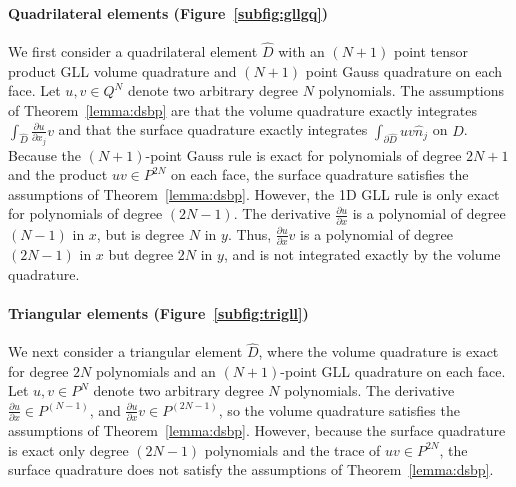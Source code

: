 \documentclass{svjour3}                     %
\renewcommand{\hat}{\widehat}
\newcommand{\pd}[2]{\frac{\partial#1}{\partial#2}}
\begin{document}
\paragraph{Quadrilateral elements (Figure~\ref{subfig:gllgq})} We first consider a quadrilateral element $\hat{D}$ with an $(N+1)$ point tensor product GLL volume quadrature and $(N+1)$ point Gauss quadrature on each face.  Let $u,v \in Q^N$ denote two arbitrary degree $N$ polynomials.  The assumptions of Theorem~\ref{lemma:dsbp} are that the volume quadrature exactly integrates $\int_{\hat{D}} \pd{u}{x_j} v$ and that the surface quadrature exactly integrates $\int_{\partial \hat{D}} u v \hat{n}_j$ on $\hat{D}$.  Because the $(N+1)$-point Gauss rule is exact for polynomials of degree $2N+1$ and the product $uv \in P^{2N}$ on each face, the surface quadrature satisfies the assumptions of Theorem~\ref{lemma:dsbp}.  However, the 1D GLL rule is only exact for polynomials of degree $(2N-1)$.  The derivative $\pd{u}{x}$ is a polynomial of degree $(N-1)$ in $x$, but is degree $N$ in $y$.  Thus, $\pd{u}{x}v$ is a polynomial of degree $(2N-1)$ in $x$ but degree $2N$ in $y$, and is not integrated exactly by the volume quadrature.  

\paragraph{Triangular elements (Figure~\ref{subfig:trigll})} We next consider a triangular element $\hat{D}$, where the volume quadrature is exact for degree $2N$ polynomials \cite{xiao2010quadrature} and an $(N+1)$-point GLL quadrature on each face.  Let $u,v \in P^N$ denote two arbitrary degree $N$ polynomials.  The derivative $\pd{u}{x} \in P^{(N-1)}$, and $\pd{u}{x}v \in P^{(2N-1)}$, so the volume quadrature satisfies the assumptions of Theorem~\ref{lemma:dsbp}.  However, because the surface quadrature is exact only degree $(2N-1)$ polynomials and the trace of $uv\in P^{2N}$, the surface quadrature does not satisfy the assumptions of Theorem~\ref{lemma:dsbp}.
\end{document}
